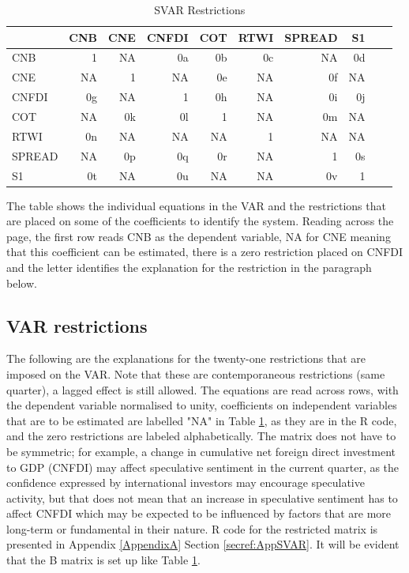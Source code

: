 \documentclass[12pt, a4paper, oneside]{article}\usepackage[]{graphicx}\usepackage[]{color}
\begin{document}
 
\begin{table}[t]
\begin{threeparttable}
\caption{SVAR Restrictions}
\begin{tabular}{p{4cm} rrrrrrrrr}	
  \hline
 &  CNB & CNE & CNFDI & COT & RTWI & SPREAD & S1 \\ 
  \hline
  CNB & 1 & NA & 0a & 0b & 0c & NA & 0d\\ 
  CNE & NA & 1 & NA & 0e & NA & 0f & NA\\ 
  CNFDI & 0g & NA & 1 & 0h & NA & 0i & 0j\\ 
  COT & NA & 0k & 0l & 1 & NA & 0m & NA \\ 
   RTWI & 0n & NA & NA & NA & 1 & NA & NA\\ 
  SPREAD & NA & 0p & 0q & 0r & NA & 1 & 0s\\ 
  S1 & 0t & NA & 0u & NA & NA & 0v & 1\\ 
   \hline
\end{tabular}
\label{tabref:svar1}
\begin{tablenotes}
\small
\item The table shows the individual equations in the VAR and the restrictions that are placed on some of the coefficients to identify the system.  Reading across the page, the first row reads CNB as the dependent variable, NA for CNE meaning that this coefficient can be estimated, there is a zero restriction placed on CNFDI and the letter identifies the explanation for the restriction in the paragraph below.  
\end{tablenotes}
\end{threeparttable}  
\end{table}

\subsection{VAR restrictions}\label{secref:varres}
The following are the explanations for the twenty-one restrictions that are imposed on the VAR.  Note that these are contemporaneous restrictions (same quarter), a lagged effect is still allowed.  The equations are read across rows, with the dependent variable normalised to unity, coefficients on independent variables that are to be estimated are labelled "NA" in Table \ref{tabref:svar1}, as they are in the R code, and the zero restrictions are labeled alphabetically.  The matrix does not have to be symmetric; for example, a change in cumulative net foreign direct investment to GDP (CNFDI) may affect speculative sentiment in the current quarter, as the confidence expressed by international investors may encourage speculative activity, but that does not mean that an increase in speculative sentiment has to affect CNFDI which may be expected to be influenced by factors that are more long-term or fundamental in their nature.   R code for the restricted matrix is presented in Appendix \ref{AppendixA} Section \ref{secref:AppSVAR}. It will be evident that the B matrix is set up like Table \ref{tabref:svar1}.   
\end{document}
